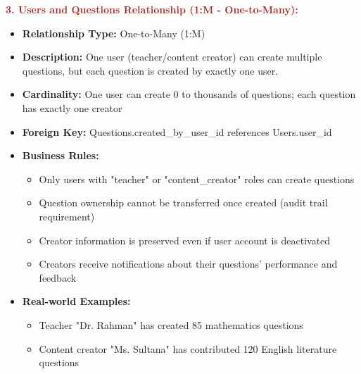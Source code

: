 \documentclass[12pt,a4paper,oneside]{book}
\begin{document}
\textbf{\textcolor{brown}{3. Users and Questions Relationship (1:M - One-to-Many):}}
\begin{itemize}
    \item \textbf{Relationship Type:} One-to-Many (1:M)
    \item \textbf{Description:} One user (teacher/content creator) can create multiple questions, but each question is created by exactly one user.
    \item \textbf{Cardinality:} One user can create 0 to thousands of questions; each question has exactly one creator
    \item \textbf{Foreign Key:} Questions.created\_by\_user\_id references Users.user\_id
    \item \textbf{Business Rules:}
        \begin{itemize}
            \item Only users with "teacher" or "content\_creator" roles can create questions
            \item Question ownership cannot be transferred once created (audit trail requirement)
            \item Creator information is preserved even if user account is deactivated
            \item Creators receive notifications about their questions' performance and feedback
        \end{itemize}
    \item \textbf{Real-world Examples:}
        \begin{itemize}
            \item Teacher "Dr. Rahman" has created 85 mathematics questions
            \item Content creator "Ms. Sultana" has contributed 120 English literature questions
        \end{itemize}
\end{itemize}
\end{document}

